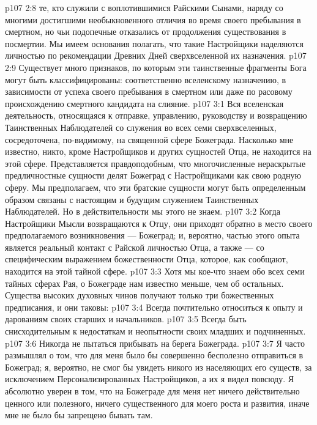 \vs p107 2:8 \bibnobreakspace {} те, кто служили с воплотившимися Райскими Сынами, наряду со многими достигшими необыкновенного отличия во время своего пребывания в смертном, но чьи подопечные отказались от продолжения существования в посмертии. Мы имеем основания полагать, что такие Настройщики наделяются личностью по рекомендации Древних Дней сверхвселенной их назначения.
\vs p107 2:9 \pc Существует много признаков, по которым эти таинственные фрагменты Бога могут быть классифицированы: соответственно вселенскому назначению, в зависимости от успеха своего пребывания в смертном или даже по расовому происхождению смертного кандидата на слияние.
\vs p107 3:1 Вся вселенская деятельность, относящаяся к отправке, управлению, руководству и возвращению Таинственных Наблюдателей со служения во всех семи сверхвселенных, сосредоточена, по\hyp{}видимому, на священной сфере Божеграда. Насколько мне известно, никто, кроме Настройщиков и других сущностей Отца, не находится на этой сфере. Представляется правдоподобным, что многочисленные нераскрытые предличностные сущности делят Божеград с Настройщиками как свою родную сферу. Мы предполагаем, что эти братские сущности могут быть определенным образом связаны с настоящим и будущим служением Таинственных Наблюдателей. Но в действительности мы этого не знаем.
\vs p107 3:2 Когда Настройщики Мысли возвращаются к Отцу, они приходят обратно в место своего предполагаемого возникновения --- Божеград; и, вероятно, частью этого опыта является реальный контакт с Райской личностью Отца, а также --- со специфическим выражением божественности Отца, которое, как сообщают, находится на этой тайной сфере.
\vs p107 3:3 Хотя мы кое\hyp{}что знаем обо всех семи тайных сферах Рая, о Божеграде нам известно меньше, чем об остальных. Существа высоких духовных чинов получают только три божественных предписания, и они таковы:
\vs p107 3:4 \bibnobreakspace Всегда почтительно относиться к опыту и дарованиям своих старших и начальников.
\vs p107 3:5 \bibnobreakspace Всегда быть снисходительным к недостаткам и неопытности своих младших и подчиненных.
\vs p107 3:6 \bibnobreakspace Никогда не пытаться прибывать на берега Божеграда.
\vs p107 3:7 Я часто размышлял о том, что для меня было бы совершенно бесполезно отправиться в Божеград; я, вероятно, не смог бы увидеть никого из населяющих его существ, за исключением Персонализированных Настройщиков, а их я видел повсюду. Я абсолютно уверен в том, что на Божеграде для меня нет ничего действительно ценного или полезного, ничего существенного для моего роста и развития, иначе мне не было бы запрещено бывать там.

